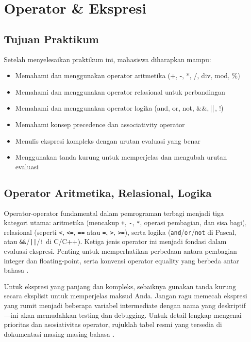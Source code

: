 \documentclass[../main.tex]{subfiles}
\begin{document}
\chapter{Operator \& Ekspresi}

\section*{Tujuan Praktikum}
Setelah menyelesaikan praktikum ini, mahasiswa diharapkan mampu:
\begin{itemize}
  \item Memahami dan menggunakan operator aritmetika (+, -, *, /, div, mod, \%)
  \item Memahami dan menggunakan operator relasional untuk perbandingan
  \item Memahami dan menggunakan operator logika (and, or, not, \&\&, ||, !)
  \item Memahami konsep precedence dan associativity operator
  \item Menulis ekspresi kompleks dengan urutan evaluasi yang benar
  \item Menggunakan tanda kurung untuk memperjelas dan mengubah urutan evaluasi
\end{itemize}

\section{Operator Aritmetika, Relasional, Logika}
Operator-operator fundamental dalam pemrograman terbagi menjadi tiga kategori utama: aritmetika (mencakup \texttt{+}, \texttt{-}, \texttt{*}, operasi pembagian, dan sisa bagi), relasional (seperti \texttt{\textless}, \texttt{\textless=}, \texttt{==} atau \texttt{=}, \texttt{\textgreater}, \texttt{\textgreater=}), serta logika (\texttt{and}/\texttt{or}/\texttt{not} di Pascal, atau \texttt{\&\&}/\texttt{||}/\texttt{!} di C/C++). Ketiga jenis operator ini menjadi fondasi dalam evaluasi ekspresi. Penting untuk memperhatikan perbedaan antara pembagian integer dan floating-point, serta konvensi operator equality yang berbeda antar bahasa \parencite{pascal-tutorial-wikibooks,gnu-c-manual,cpp-reference}.

Untuk ekspresi yang panjang dan kompleks, sebaiknya gunakan tanda kurung secara eksplisit untuk memperjelas maksud Anda. Jangan ragu memecah ekspresi yang rumit menjadi beberapa variabel intermediate dengan nama yang deskriptif—ini akan memudahkan testing dan debugging. Untuk detail lengkap mengenai prioritas dan asosiativitas operator, rujuklah tabel resmi yang tersedia di dokumentasi masing-masing bahasa \parencite{gnu-c-manual,cpp-op-precedence,c-op-precedence}.
\end{document}
